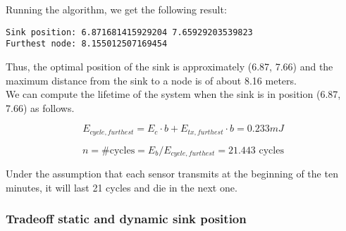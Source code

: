 Running the algorithm, we get the following result:
\begin{verbatim}
Sink position: 6.871681415929204 7.65929203539823
Furthest node: 8.155012507169454
\end{verbatim}

Thus, the optimal position of the sink is approximately (6.87, 7.66) and the maximum distance from the sink to a node is of about 8.16 meters.\\
We can compute the lifetime of the system when the sink is in position (6.87, 7.66) as follows.

\[
E_{cycle, furthest} = E_c \cdot b + E_{tx, furthest} \cdot b = 0.233 mJ
\]

\[
n = \text{\# cycles} = E_b / E_{cycle, furthest} = 21.443 \text{ cycles}
\]

Under the assumption that each sensor transmits at the beginning of the ten minutes, it will last 21 cycles and die in the next one.






\subsubsection{Tradeoff static and dynamic sink position}
